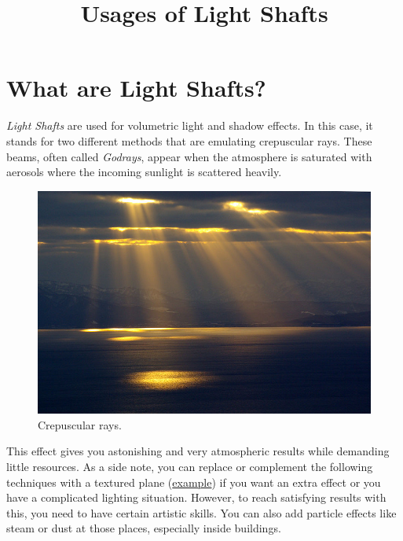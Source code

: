 \documentclass[A4]{article}
\begin{document}
	\title{Usages of Light Shafts}
	\date{}
	
	\maketitle
	
	\section*{What are Light Shafts?}
	\textit{Light Shafts} are used for volumetric light and shadow effects. In this case, it stands for two different methods that are emulating crepuscular rays. These beams, often called \textit{Godrays}, appear when the atmosphere is saturated with aerosols where the incoming sunlight is scattered heavily.
	\begin{figure}
		\begin{center}
			\vspace{-20px}
			\includegraphics[scale=0.3]{CrepuscularRays.jpg}
		\end{center}
		\caption{Crepuscular rays.}
	\end{figure}
	This effect gives you astonishing and very atmospheric results while demanding little resources. As a side note, you can replace or complement the following techniques with a textured plane (\href{https://forums.unrealengine.com/showthread.php?69406-Tutorial-Godrays!}{example}) if you want an extra effect or you have a complicated lighting situation. However, to reach satisfying results with this, you need to have certain artistic skills. You can also add particle effects like steam or dust at those places, especially inside buildings.
	
\end{document}
